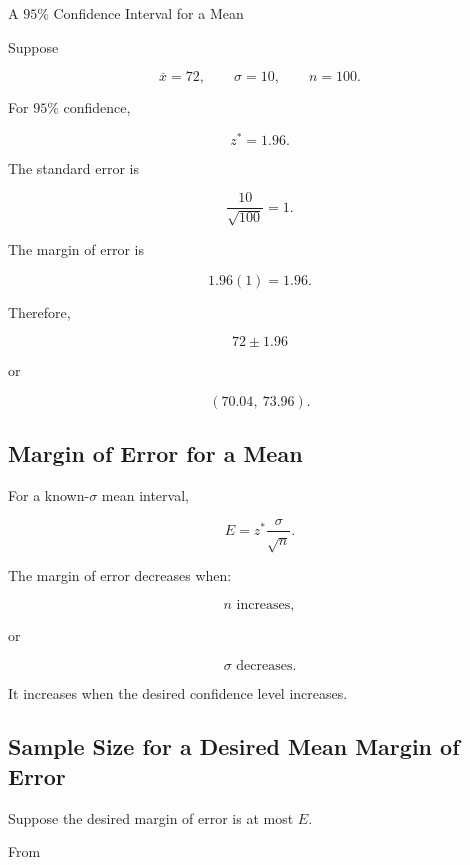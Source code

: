 \begin{workedexamplebox}{A \(95\%\) Confidence Interval for a Mean}

Suppose

\[
\overline{x}=72,
\qquad
\sigma=10,
\qquad
n=100.
\]

For \(95\%\) confidence,

\[
z^*=1.96.
\]

The standard error is

\[
\frac{10}{\sqrt{100}}
=
1.
\]

The margin of error is

\[
1.96(1)
=
1.96.
\]

Therefore,

\begin{answerbox}
\[
\boxed{
72\pm1.96
}
\]

or

\[
\boxed{
(70.04,\ 73.96).
}
\]
\end{answerbox}

\end{workedexamplebox}

\subsection{Margin of Error for a Mean}
\label{subsec:margin-error-mean}

For a known-\(\sigma\) mean interval,

\[
\boxed{
E
=
z^*
\frac{\sigma}{\sqrt{n}}.
}
\]

The margin of error decreases when:

\[
\boxed{
n
\text{ increases},
}
\]

or

\[
\boxed{
\sigma
\text{ decreases}.
}
\]

It increases when the desired confidence level increases.

\subsection{Sample Size for a Desired Mean Margin of Error}
\label{subsec:sample-size-mean-ci}

Suppose the desired margin of error is at most \(E\).

From

